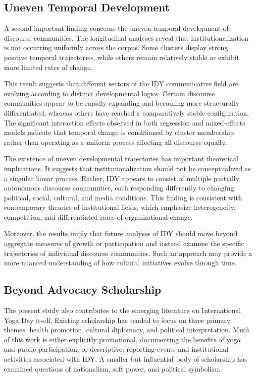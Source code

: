 \documentclass[11pt]{article}
\begin{document}
\subsection{Uneven Temporal Development}



A second important finding concerns the uneven temporal development of discourse communities. The longitudinal analyses
reveal that institutionalization is not occurring uniformly across the corpus. Some clusters display strong positive
temporal trajectories, while others remain relatively stable or exhibit more limited rates of change.


This result suggests that different sectors of the IDY communicative field are evolving according to distinct
developmental logics. Certain discourse communities appear to be rapidly expanding and becoming more structurally
differentiated, whereas others have reached a comparatively stable configuration. The significant interaction effects
observed in both regression and mixed-effects models indicate that temporal change is conditioned by cluster membership
rather than operating as a uniform process affecting all discourse equally.


The existence of uneven developmental trajectories has important theoretical implications. It suggests that
institutionalization should not be conceptualized as a singular linear process. Rather, IDY appears to consist of
multiple partially autonomous discourse communities, each responding differently to changing political, social,
cultural, and media conditions. This finding is consistent with contemporary theories of institutional fields, which
emphasize heterogeneity, competition, and differentiated rates of organizational change.


Moreover, the results imply that future analyses of IDY should move beyond aggregate measures of growth or participation
and instead examine the specific trajectories of individual discourse communities. Such an approach may provide a more
nuanced understanding of how cultural initiatives evolve through time.


\subsection{Beyond Advocacy Scholarship}



The present study also contributes to the emerging literature on International Yoga Day itself. Existing scholarship has
tended to focus on three primary themes: health promotion, cultural diplomacy, and political interpretation. Much of
this work is either explicitly promotional, documenting the benefits of yoga and public participation, or descriptive,
reporting events and institutional activities associated with IDY. A smaller but influential body of scholarship has
examined questions of nationalism, soft power, and political symbolism.
\end{document}
